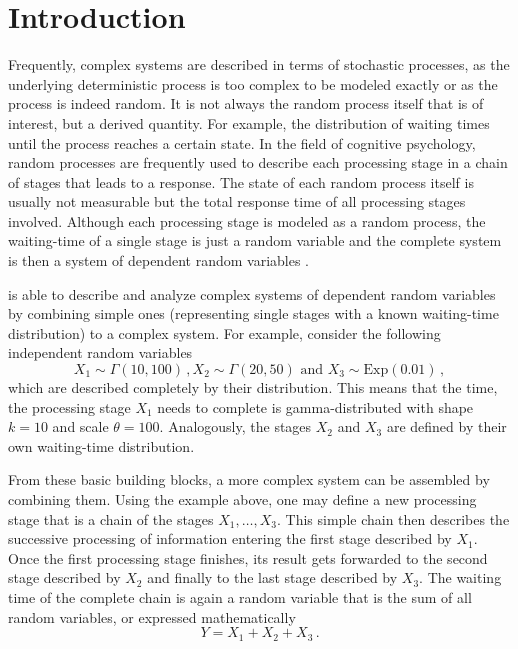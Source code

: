  \section{Introduction} \label{sec:intro}
Frequently, complex systems are described in terms of stochastic processes, as the
underlying deterministic process is too complex to be modeled exactly or as the
process is indeed random. It is not always the random process itself that is of 
interest, but a derived quantity. For example, the distribution of waiting times until the
process reaches a certain state. In the field of cognitive psychology, random processes are frequently used to
describe each processing stage in a chain of stages that leads to a response. The state of
each random process itself is usually not measurable but the total response time of all processing 
stages involved. Although each processing stage is modeled as a random process, the waiting-time
of a single stage is just a random variable and the complete system is then a system of dependent random 
variables \cite[e.g.,][]{Reichle2003}.

 is able to describe and analyze complex systems of dependent random variables
by combining simple ones (representing single stages with a known waiting-time distribution) to
a complex system. For example, consider the following independent random variables
\begin{equation}
  X_1 \sim \Gamma(10, 100)\,, X_2 \sim \Gamma(20, 50)\text{ and } X_3 \sim \text{Exp}(0.01)\,,\nonumber
\end{equation}
which are described completely by their distribution. This means that the time, the
processing stage $X_1$ needs to complete is gamma-distributed with shape $k=10$ and scale
$\theta=100$. Analogously, the stages $X_2$ and $X_3$ are defined by their own waiting-time 
distribution.

From these basic building blocks, a more complex system can be assembled by
combining them. Using the example above, one may define a new processing stage that is a chain of
the stages $X_1,\dots,X_3$. This simple chain then describes the successive
processing of information entering the first stage described by $X_1$.
Once the first processing stage finishes, its result gets forwarded to the second stage described
by $X_2$ and finally to the last stage described by $X_3$. The waiting time of the
complete chain is again a random variable that is the sum of all random variables,
or expressed mathematically
\begin{equation}
 Y = X_1 + X_2 + X_3\,. \nonumber
\end{equation}

